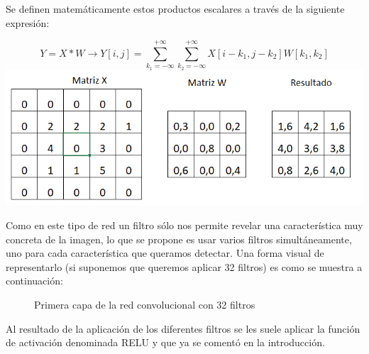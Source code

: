\documentclass[
  a4paper,
  DIV=11,
  numbers=noendperiod]{scrreprt}
\begin{document}
Se definen matemáticamente estos productos escalares a través de la
siguiente expresión:

\[
Y=X * W \rightarrow Y[i, j]=\sum_{k_1=-\infty}^{+\infty} \sum_{k_2=-\infty}^{+\infty} X\left[i-k_1, j-k_2\right] W\left[k_1, k_2\right]
\] \includegraphics{imagenes/capitulo1/producto_convolucion.png}

Como en este tipo de red un filtro sólo nos permite revelar una
característica muy concreta de la imagen, lo que se propone es usar
varios filtros simultáneamente, uno para cada característica que
queramos detectar. Una forma visual de representarlo (si suponemos que
queremos aplicar 32 filtros) es como se muestra a continuación:

\begin{figure}


\caption{\label{fig-primera-capa-convolucional}Primera capa de la red
convolucional con 32 filtros}

\end{figure}%

Al resultado de la aplicación de los diferentes filtros se les suele
aplicar la función de activación denominada RELU y que ya se comentó en
la introducción.
\end{document}
